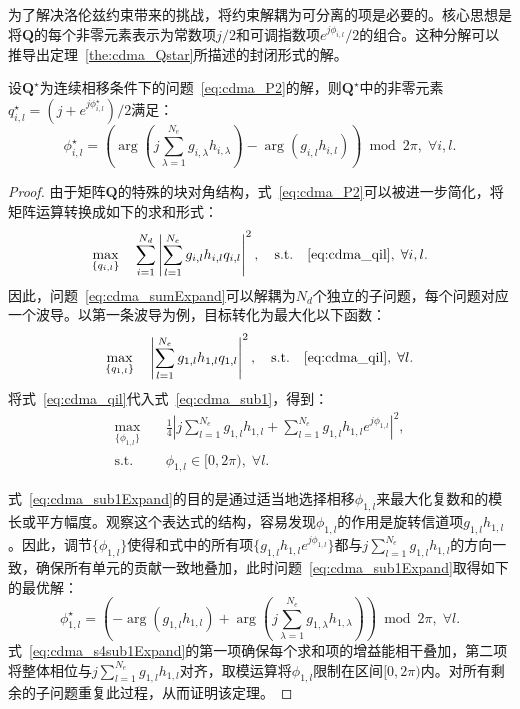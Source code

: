 为了解决洛伦兹约束带来的挑战，将约束解耦为可分离的项是必要的。核心思想是将$\bm{Q}$的每个非零元素表示为常数项$j/2$和可调指数项$e^{j \phi_{i,l}}/2$的组合。这种分解可以推导出定理~\ref{the:cdma_Qstar}所描述的封闭形式的解。
\begin{theorem}\label{the:cdma_Qstar}
	设$\bm{Q}^\star$为连续相移条件下的问题~\eqref{eq:cdma_P2}的解，则$\bm{Q}^\star$中的非零元素$q_{i,l}^\star=(j+e^{j \phi_{i,l}^\star})/2$满足：
	\begin{equation}\label{eq:cdma_phi_star}
		\phi_{i,l}^\star = \left(\arg\left(j\sum_{\lambda=1}^{N_e} g_{i,\lambda} h_{i,\lambda}\right)
		-\arg\left(g_{i,l} h_{i,l} \right)\right) \bmod 2\pi,\; \forall i,l.
	\end{equation}
\end{theorem}

\begin{proof}
	由于矩阵$\bm{Q}$的特殊的块对角结构，式~\eqref{eq:cdma_P2}可以被进一步简化，将矩阵运算转换成如下的求和形式：
	\begin{equation}\label{eq:cdma_sumExpand}
		\max_{\{q_{i,l}\}} \quad \sum_{i=1}^{N_{d}}\left|\sum_{l=1}^{N_{e}} g_{i, l} h_{i, l} q_{i,l}\right|^{2}, \quad
		\text{s.t.} \quad \eqref{eq:cdma_qil},\; \forall i,l.
	\end{equation}
	因此，问题~\eqref{eq:cdma_sumExpand}可以解耦为$N_d$个独立的子问题，每个问题对应一个波导。以第一条波导为例，目标转化为最大化以下函数：
	\begin{equation}\label{eq:cdma_sub1}
		\max_{\{q_{1,l}\}} \quad \left|\sum_{l=1}^{N_{e}} g_{1, l} h_{1, l} q_{1, l}\right|^{2}, \quad
		\text{s.t.} \quad \eqref{eq:cdma_qil},\; \forall l.
	\end{equation}
	将式~\eqref{eq:cdma_qil}代入式~\eqref{eq:cdma_sub1}，得到：
	\begin{align}\label{eq:cdma_sub1Expand}
		\max_{\{\phi_{1,l}\}} \quad &\frac{1}{4}\left|j\sum_{l=1}^{N_{e}} g_{1, l} h_{1, l} + \sum_{l=1}^{N_{e}} g_{1, l} h_{1, l} e^{j \phi_{1,l}} \right|^{2}, \\
		\text{s.t.} \quad &\phi_{1,l} \in [0,2\pi),\; \forall l.
	\end{align}
	
	式~\eqref{eq:cdma_sub1Expand}的目的是通过适当地选择相移$\phi_{1,l}$来最大化复数和的模长或平方幅度。观察这个表达式的结构，容易发现$\phi_{1,l}$的作用是旋转信道项$g_{1, l} h_{1, l}$。因此，调节$\{\phi_{1,l}\}$使得和式中的所有项$\{g_{1, l} h_{1, l}e^{j \phi_{1, l}}\}$都与$j\sum_{l=1}^{N_{e}} g_{1, l} h_{1, l}$的方向一致，确保所有单元的贡献一致地叠加，此时问题~\eqref{eq:cdma_sub1Expand}取得如下的最优解：
	\begin{equation}\label{eq:cdma_s4sub1Expand}
		\phi_{1,l}^{\star}=\left(-\arg(g_{1, l} h_{1, l}) + \arg\left( j\sum_{\lambda=1}^{N_{e}} g_{1, \lambda} h_{1, \lambda}\right)\right) \bmod 2\pi,\; \forall l.
	\end{equation}
	式~\eqref{eq:cdma_s4sub1Expand}的第一项确保每个求和项的增益能相干叠加，第二项将整体相位与$j\sum_{l=1}^{N_{e}} g_{1, l} h_{1, l}$对齐，取模运算将$\phi_{1,l}$限制在区间$[0, 2\pi)$内。对所有剩余的子问题重复此过程，从而证明该定理。
\end{proof}

